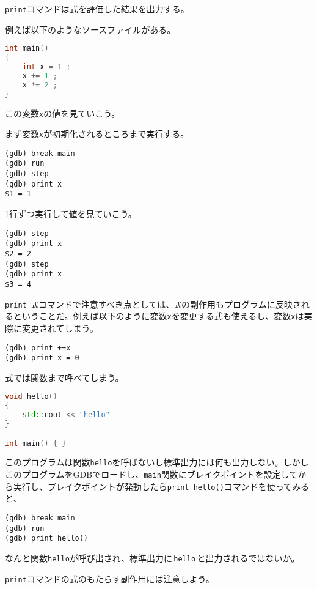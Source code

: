 \texttt{print}コマンドは式を評価した結果を出力する。

例えば以下のようなソースファイルがある。

\begin{lstlisting}[language={C++}]
int main()
{
    int x = 1 ;
    x += 1 ;
    x *= 2 ;
}
\end{lstlisting}

この変数\texttt{x}の値を見ていこう。

まず変数\texttt{x}が初期化されるところまで実行する。

\begin{lstlisting}[style=terminal]
(gdb) break main
(gdb) run
(gdb) step
(gdb) print x
$1 = 1
\end{lstlisting}

1行ずつ実行して値を見ていこう。

\begin{lstlisting}[style=terminal]
(gdb) step
(gdb) print x
$2 = 2
(gdb) step
(gdb) print x
$3 = 4
\end{lstlisting}

\texttt{print 式}コマンドで注意すべき点としては、\texttt{式}の副作用もプログラムに反映されるということだ。例えば以下のように変数\texttt{x}を変更する式も使えるし、変数\texttt{x}は実際に変更されてしまう。

\begin{lstlisting}[style=terminal]
(gdb) print ++x
(gdb) print x = 0
\end{lstlisting}

式では関数まで呼べてしまう。

\ifTombow\pagebreak\fi
\begin{lstlisting}[language={C++}]
void hello()
{
    std::cout << "hello"
}

int main() { }
\end{lstlisting}

このプログラムは関数\texttt{hello}を呼ばないし標準出力には何も出力しない。しかしこのプログラムをGDBでロードし、\texttt{main}関数にブレイクポイントを設定してから実行し、ブレイクポイントが発動したら\texttt{print hello()}コマンドを使ってみると、

\begin{lstlisting}[style=terminal]
(gdb) break main
(gdb) run
(gdb) print hello()
\end{lstlisting}

なんと関数\texttt{hello}が呼び出され、標準出力に\,\texttt{hello}\,と出力されるではないか。

\texttt{print}コマンドの式のもたらす副作用には注意しよう。

